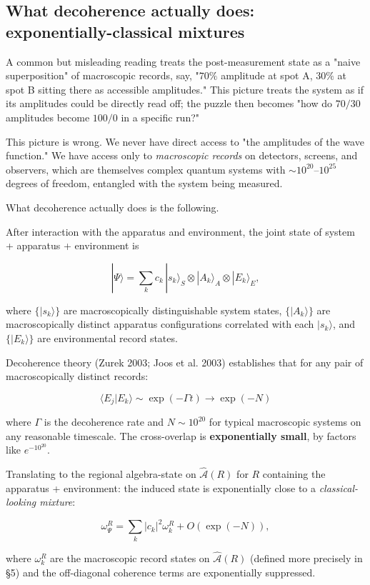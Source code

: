 \documentclass[11pt,a4paper]{article}
\begin{document}
\subsection{What decoherence actually does: exponentially-classical mixtures}

A common but misleading reading treats the post-measurement state as a "naive superposition" of macroscopic records, say, "$70\%$ amplitude at spot A, $30\%$ at spot B sitting there as accessible amplitudes." This picture treats the system as if its amplitudes could be directly read off; the puzzle then becomes "how do $70/30$ amplitudes become $100/0$ in a specific run?"

This picture is wrong. We never have direct access to "the amplitudes of the wave function." We have access only to \emph{macroscopic records} on detectors, screens, and observers, which are themselves complex quantum systems with $\sim 10^{20}$–$10^{25}$ degrees of freedom, entangled with the system being measured.

What decoherence actually does is the following.

After interaction with the apparatus and environment, the joint state of system + apparatus + environment is

\[
|\Psi\rangle = \sum_k c_k \,|s_k\rangle_S \otimes |A_k\rangle_A \otimes |E_k\rangle_E,
\]

where $\{|s_k\rangle\}$ are macroscopically distinguishable system states, $\{|A_k\rangle\}$ are macroscopically distinct apparatus configurations correlated with each $|s_k\rangle$, and $\{|E_k\rangle\}$ are environmental record states.

Decoherence theory (Zurek 2003; Joos et al. 2003) establishes that for any pair of macroscopically distinct records:

\[
\langle E_j | E_k \rangle \sim \exp(-\Gamma t) \to \exp(-N)
\]

where $\Gamma$ is the decoherence rate and $N \sim 10^{20}$ for typical macroscopic systems on any reasonable timescale. The cross-overlap is \textbf{exponentially small}, by factors like $e^{-10^{20}}$.

Translating to the regional algebra-state on $\hat{\mathcal{A}}(R)$ for $R$ containing the apparatus + environment: the induced state is exponentially close to a \emph{classical-looking mixture}:

\[
\omega_\Psi^{R} = \sum_k |c_k|^2 \omega_k^R + O(\exp(-N)),
\]

where $\omega_k^R$ are the macroscopic record states on $\hat{\mathcal{A}}(R)$ (defined more precisely in §5) and the off-diagonal coherence terms are exponentially suppressed.
\end{document}
